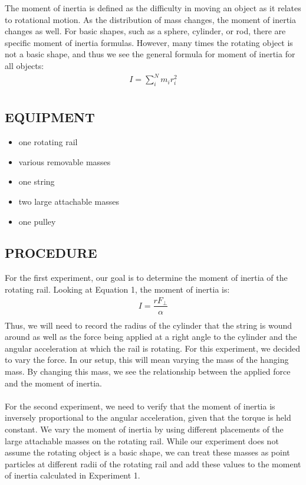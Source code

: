 \documentclass [12pt, letterpaper, twoside] {article}
\begin{document}
\noindent
The moment of inertia is defined as the difficulty in moving an object as it relates to rotational motion. As the distribution of mass changes, the moment of inertia changes as well. For basic shapes, such as a sphere, cylinder, or rod, there are specific moment of inertia formulas. However, many times the rotating object is not a basic shape, and thus we see the general formula for moment of inertia for all objects:
\begin {equation}
  \begin {split}
    I = \sum_{i}^{N}m_{i}r_{i}^2 \\
  \end {split}
\end {equation}

\subsection* {EQUIPMENT}
  \noindent
  \begin {itemize}
    \itemsep0em
    \item {one rotating rail}
    \item {various removable masses}
    \item {one string}
    \item {two large attachable masses}
    \item {one pulley}
  \end {itemize}

\subsection* {PROCEDURE}
For the first experiment, our goal is to determine the moment of inertia of the rotating rail. Looking at Equation 1, the moment of inertia is:
\begin {equation}
  \begin {split}  
    I = \dfrac{rF_{\perp}}{\alpha} \\
  \end {split}
\end {equation}
Thus, we will need to record the radius of the cylinder that the string is wound around as well as the force being applied at a right angle to the cylinder and the angular acceleration at which the rail is rotating. For this experiment, we decided to vary the force. In our setup, this will mean varying the mass of the hanging mass. By changing this mass, we see the relationship between the applied force and the moment of inertia. \\\\
For the second experiment, we need to verify that the moment of inertia is inversely proportional to the angular acceleration, given that the torque is held constant. We vary the moment of inertia by using different placements of the large attachable masses on the rotating rail. While our experiment does not assume the rotating object is a basic shape, we can treat these masses as point particles at different radii of the rotating rail and add these values to the moment of inertia calculated in Experiment 1.
\end{document}
